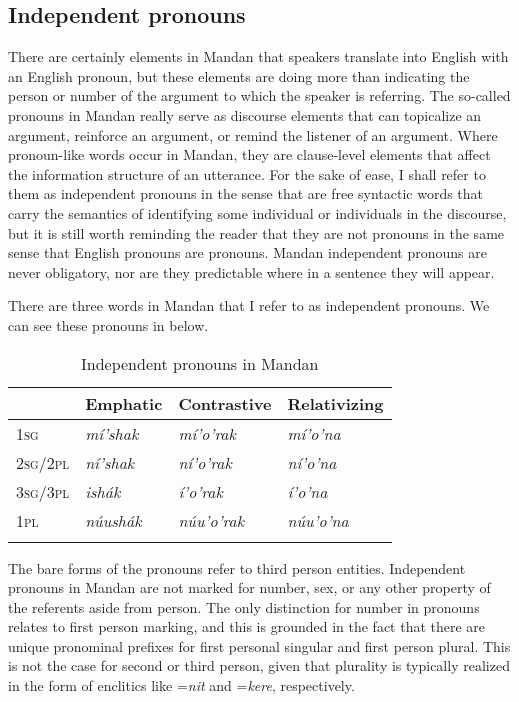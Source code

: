\subsection{Independent pronouns}\label{SubSecIndependentPronouns}

There are certainly elements in Mandan that speakers translate into English with an English pronoun, but these elements are doing more than indicating the person or number of the argument to which the speaker is referring. The so-called pronouns in Mandan really serve as discourse elements that can topicalize an argument, reinforce an argument, or remind the listener of an argument. Where pronoun-like words occur in Mandan, they are clause-level elements that affect the information structure of an utterance. For the sake of ease, I shall refer to them as independent pronouns in the sense that are free syntactic words that carry the semantics of identifying some individual or individuals in the discourse, but it is still worth reminding the reader that they are not pronouns in the same sense that English pronouns are pronouns. Mandan independent pronouns are never obligatory, nor are they predictable where in a sentence they will appear.

There are three words in Mandan that I refer to as independent pronouns. We can see these pronouns in  below.

\begin{table}

\caption{Independent pronouns in Mandan}\label{PronounsInMandan} 

    \begin{tabular}{llll}
\lsptoprule
    ~   &\textbf{Emphatic}&  \textbf{Contrastive}&\textbf{Relativizing}\\
\midrule
    \textsc{1sg}&\textit{mí'shak}&\textit{mí'o'rak}&\textit{mí'o'na}\\
    \textsc{2sg/2pl}&\textit{ní'shak}&\textit{ní'o'rak}&\textit{ní'o'na}\\
    \textsc{3sg/3pl}&\textit{ishák}&\textit{í'o'rak}&\textit{í'o'na}\\    
    \textsc{1pl}&\textit{núushák}&\textit{núu'o'rak}&\textit{núu'o'na}\\    
    \lspbottomrule
    \end{tabular}

\end{table}



The bare forms of the pronouns refer to third person entities. Independent pronouns in Mandan are not marked for number, sex, or any other property of the referents aside from person. The only distinction for number in pronouns relates to first person marking, and this is grounded in the fact that there are unique pronominal prefixes for first personal singular and first person plural. This is not the case for second or third person, given that plurality is typically realized in the form of enclitics like =\textit{nit} and =\textit{kere}, respectively.

